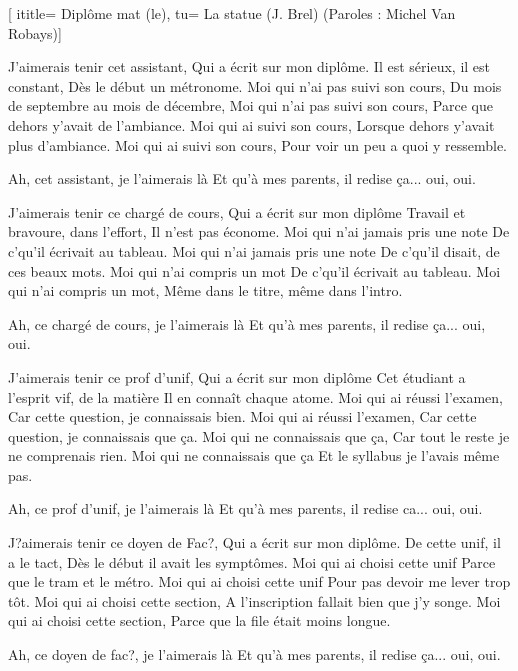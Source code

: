  [
ititle= {Diplôme mat (le)},
tu=  {La statue (J. Brel) (Paroles : Michel Van Robays)}]

\beginverse
J'aimerais tenir cet assistant,
Qui a écrit sur mon diplôme.
Il est sérieux, il est constant,
Dès le début un métronome.
Moi qui n'ai pas suivi son cours,
Du mois de septembre au mois de décembre,
Moi qui n'ai pas suivi son cours,
Parce que dehors y'avait de l'ambiance.
Moi qui ai suivi son cours,
Lorsque dehors y'avait plus d'ambiance.
Moi qui ai suivi son cours,
Pour voir un peu a quoi y ressemble.
\endverse

\beginchorus
Ah, cet assistant, je l'aimerais là
Et qu'à mes parents, il redise ça... oui, oui.
\endchorus

\beginverse
J'aimerais tenir ce chargé de cours,
Qui a écrit sur mon diplôme
Travail et bravoure, dans l'effort,
Il n'est pas économe.
Moi qui n'ai jamais pris une note
De c'qu'il écrivait au tableau.
Moi qui n'ai jamais pris une note
De c'qu'il disait, de ces beaux mots.
Moi qui n'ai compris un mot
De c'qu'il écrivait au tableau.
Moi qui n'ai compris un mot,
Même dans le titre, même dans l'intro.
\endverse

\beginchorus
Ah, ce chargé de cours, je l'aimerais là
Et qu'à mes parents, il redise ça... oui, oui.
\endchorus

\beginverse
J'aimerais tenir ce prof d'unif,
Qui a écrit sur mon diplôme
Cet étudiant a l'esprit vif, de la matière
Il en connaît chaque atome.
Moi qui ai réussi l'examen,
Car cette question, je connaissais bien.
Moi qui ai réussi l'examen,
Car cette question, je connaissais que ça.
Moi qui ne connaissais que ça,
Car tout le reste je ne comprenais rien.
Moi qui ne connaissais que ça
Et le syllabus je l'avais même pas.
\endverse

\beginchorus
Ah, ce prof d'unif, je l'aimerais là
Et qu'à mes parents, il redise ca... oui, oui.
\endchorus

\beginverse
J?aimerais tenir ce doyen de Fac?,
Qui a écrit sur mon diplôme.
De cette unif, il a le tact,
Dès le début il avait les symptômes.
Moi qui ai choisi cette unif
Parce que le tram et le métro.
Moi qui ai choisi cette unif
Pour pas devoir me lever trop tôt.
Moi qui ai choisi cette section,
A l'inscription fallait bien que j'y songe.
Moi qui ai choisi cette section,
Parce que la file était moins longue.
\endverse

\beginchorus
Ah, ce doyen de fac?, je l'aimerais là
Et qu'à mes parents, il redise ça... oui, oui.
\endchorus


